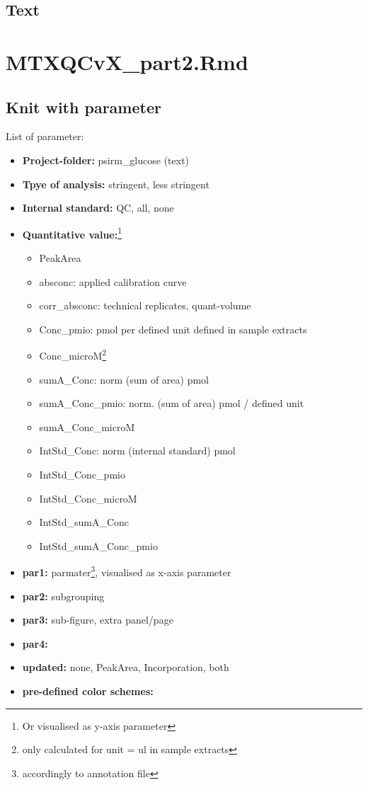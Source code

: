 \documentclass[]{book}
\providecommand{\tightlist}{%
  \setlength{\itemsep}{0pt}\setlength{\parskip}{0pt}}
\let\rmarkdownfootnote\footnote%
\def\footnote{\protect\rmarkdownfootnote}
\theoremstyle{definition}
\theoremstyle{definition}
\theoremstyle{definition}
\theoremstyle{remark}
\begin{document}
\section{Text}\label{text-1}

\chapter{MTXQCvX\_part2.Rmd}\label{part2}

\section{Knit with parameter}\label{knit-with-parameter-3}

List of parameter:

\begin{itemize}
\tightlist
\item
  \textbf{Project-folder:} psirm\_glucose (text)
\item
  \textbf{Tpye of analysis:} stringent, less stringent
\item
  \textbf{Internal standard:} QC, all, none
\item
  \textbf{Quantitative value:}\footnote{Or visualised as y-axis
    parameter}

  \begin{itemize}
  \tightlist
  \item
    PeakArea
  \item
    absconc: applied calibration curve
  \item
    corr\_absconc: technical replicates, quant-volume
  \item
    Conc\_pmio: pmol per defined unit defined in sample extracts
  \item
    Conc\_microM\footnote{only calculated for unit = ul in sample
      extracts}
  \item
    sumA\_Conc: norm (sum of area) pmol
  \item
    sumA\_Conc\_pmio: norm. (sum of area) pmol / defined unit
  \item
    sumA\_Conc\_microM
  \item
    IntStd\_Conc: norm (internal standard) pmol
  \item
    IntStd\_Conc\_pmio
  \item
    IntStd\_Conc\_microM
  \item
    IntStd\_sumA\_Conc
  \item
    IntStd\_sumA\_Conc\_pmio
  \end{itemize}
\item
  \textbf{par1:} parmater\footnote{accordingly to annotation file},
  visualised as x-axis parameter
\item
  \textbf{par2:} subgrouping
\item
  \textbf{par3:} sub-figure, extra panel/page
\item
  \textbf{par4:}
\item
  \textbf{updated:} none, PeakArea, Incorporation, both
\item
  \textbf{pre-defined color schemes:}


\end{itemize}
\end{document}
